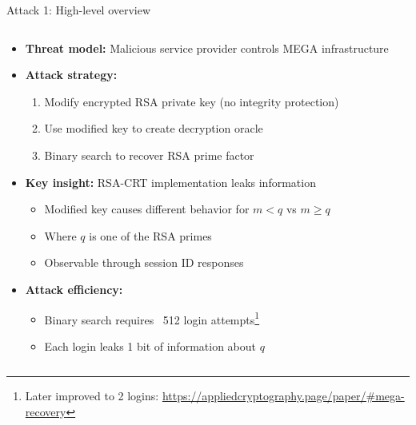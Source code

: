 \documentclass[aspectratio=169, lualatex, handout]{beamer}
\begin{document}
\begin{frame}{Attack 1: High-level overview}
	\begin{columns}[c]
		\begin{column}{1\textwidth}
			\begin{itemize}
				\item \textbf{Threat model:} Malicious service provider controls MEGA infrastructure
				\item \textbf{Attack strategy:}
				      \begin{enumerate}
					      \item Modify encrypted RSA private key (no integrity protection)
					      \item Use modified key to create decryption oracle
					      \item Binary search to recover RSA prime factor
				      \end{enumerate}
				\item \textbf{Key insight:} RSA-CRT implementation leaks information
				      \begin{itemize}
					      \item Modified key causes different behavior for $m < q$ vs $m \geq q$
					      \item Where $q$ is one of the RSA primes
					      \item Observable through session ID responses
				      \end{itemize}
				\item \textbf{Attack efficiency:}
				      \begin{itemize}
					      \item Binary search requires ~512 login attempts\footnote{Later improved to 2 logins: \url{https://appliedcryptography.page/paper/\#mega-recovery}}
					      \item Each login leaks 1 bit of information about $q$
				      \end{itemize}
			\end{itemize}
		\end{column}
	\end{columns}
\end{frame}
\end{document}
